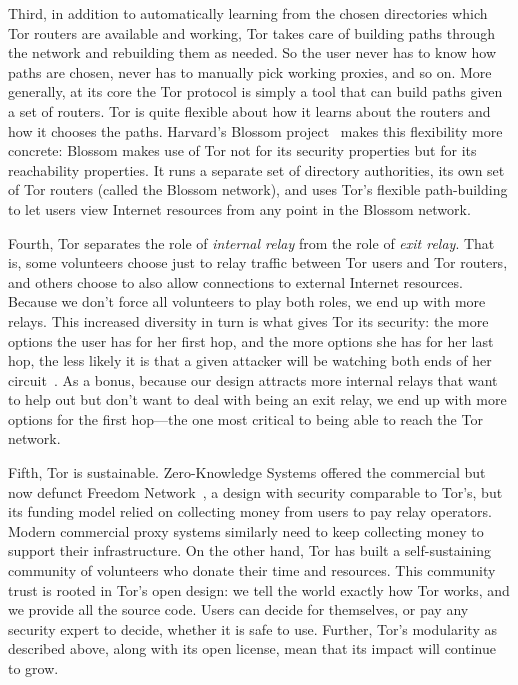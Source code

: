 \documentclass{llncs}
\begin{document}
Third, in addition to automatically learning from the chosen directories
which Tor routers are available and working, Tor takes care of building
paths through the network and rebuilding them as needed. So the user
never has to know how paths are chosen, never has to manually pick
working proxies, and so on. More generally, at its core the Tor protocol
is simply a tool that can build paths given a set of routers. Tor is
quite flexible about how it learns about the routers and how it chooses
the paths. Harvard's Blossom project~\cite{blossom-thesis} makes this
flexibility more concrete: Blossom makes use of Tor not for its security
properties but for its reachability properties. It runs a separate set
of directory authorities, its own set of Tor routers (called the Blossom
network), and uses Tor's flexible path-building to let users view Internet
resources from any point in the Blossom network.

Fourth, Tor separates the role of \emph{internal relay} from the
role of \emph{exit relay}. That is, some volunteers choose just to relay
traffic between Tor users and Tor routers, and others choose to also allow
connections to external Internet resources. Because we don't force all
volunteers to play both roles, we end up with more relays. This increased
diversity in turn is what gives Tor its security: the more options the
user has for her first hop, and the more options she has for her last hop,
the less likely it is that a given attacker will be watching both ends
of her circuit~\cite{tor-design}. As a bonus, because our design attracts
more internal relays that want to help out but don't want to deal with
being an exit relay, we end up with more options for the first hop---the
one most critical to being able to reach the Tor network.

Fifth, Tor is sustainable. Zero-Knowledge Systems offered the commercial
but now defunct Freedom Network~\cite{freedom21-security}, a design with
security comparable to Tor's, but its funding model relied on collecting
money from users to pay relay operators. Modern commercial proxy systems
similarly
need to keep collecting money to support their infrastructure. On the
other hand, Tor has built a self-sustaining community of volunteers who
donate their time and resources. This community trust is rooted in Tor's
open design: we tell the world exactly how Tor works, and we provide all
the source code. Users can decide for themselves, or pay any security
expert to decide, whether it is safe to use. Further, Tor's modularity
as described above, along with its open license, mean that its impact
will continue to grow.
\end{document}
